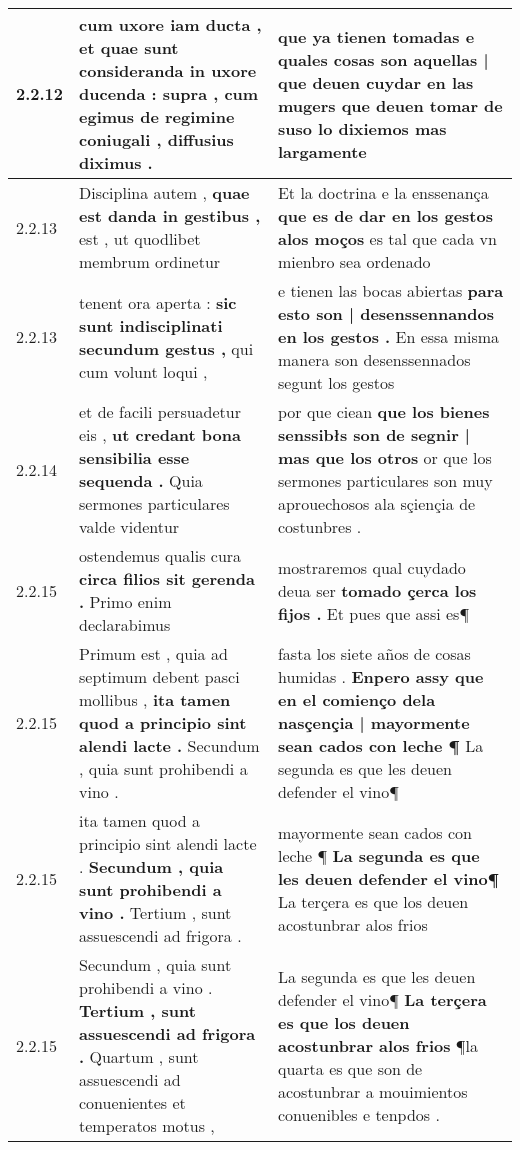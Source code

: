 \begin{tabular}{|p{1cm}|p{6.5cm}|p{6.5cm}|}
2.2.12 & cum uxore iam ducta , \textbf{ et quae sunt consideranda in uxore ducenda : } supra , cum egimus de regimine coniugali , diffusius diximus . & que ya tienen tomadas \textbf{ e quales cosas son aquellas | que deuen cuydar en las mugers } que deuen tomar de suso lo dixiemos mas largamente \\\hline
2.2.13 & Disciplina autem , \textbf{ quae est danda in gestibus , } est , ut quodlibet membrum ordinetur & Et la doctrina e la enssenança \textbf{ que es de dar en los gestos alos moços } es tal que cada vn mienbro sea ordenado \\\hline
2.2.13 & tenent ora aperta : \textbf{ sic sunt indisciplinati secundum gestus , } qui cum volunt loqui , & e tienen las bocas abiertas \textbf{ para esto son | desenssennandos en los gestos . } En essa misma manera son desenssennados segunt los gestos \\\hline
2.2.14 & et de facili persuadetur eis , \textbf{ ut credant bona sensibilia esse sequenda . } Quia sermones particulares valde videntur & por que ciean \textbf{ que los bienes senssibłs son de segnir | mas que los otros } or que los sermones particulares son muy aprouechosos ala sçiençia de costunbres . \\\hline
2.2.15 & ostendemus qualis cura \textbf{ circa filios sit gerenda . } Primo enim declarabimus & mostraremos qual cuydado deua ser \textbf{ tomado çerca los fijos . } Et pues que assi es¶ \\\hline
2.2.15 & Primum est , quia ad septimum debent pasci mollibus , \textbf{ ita tamen quod a principio sint alendi lacte . } Secundum , quia sunt prohibendi a vino . & fasta los siete años de cosas humidas . \textbf{ Enpero assy que en el comienço dela nasçençia | mayormente sean cados con leche ¶ } La segunda es que les deuen defender el vino¶ \\\hline
2.2.15 & ita tamen quod a principio sint alendi lacte . \textbf{ Secundum , quia sunt prohibendi a vino . } Tertium , sunt assuescendi ad frigora . & mayormente sean cados con leche ¶ \textbf{ La segunda es que les deuen defender el vino¶ } La terçera es que los deuen acostunbrar alos frios \\\hline
2.2.15 & Secundum , quia sunt prohibendi a vino . \textbf{ Tertium , sunt assuescendi ad frigora . } Quartum , sunt assuescendi ad conuenientes et temperatos motus , & La segunda es que les deuen defender el vino¶ \textbf{ La terçera es que los deuen acostunbrar alos frios } ¶la quarta es que son de acostunbrar a mouimientos conuenibles e tenpdos . \\\hline

\end{tabular}
